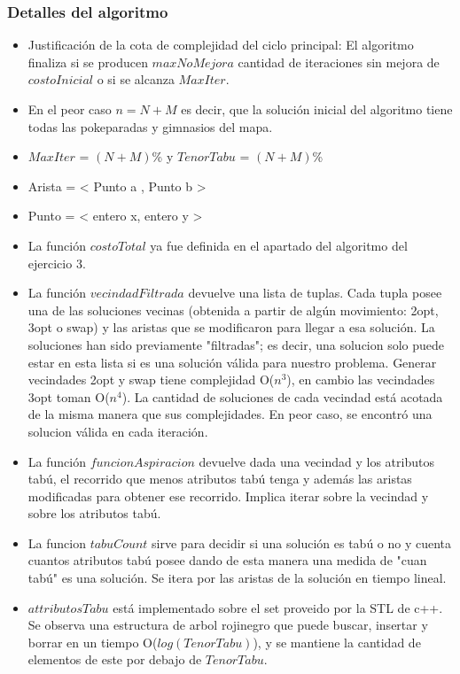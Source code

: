 \subsubsection*{Detalles del algoritmo}

\begin{itemize}
\item Justificación de la cota de complejidad del ciclo principal: El algoritmo finaliza si se producen $maxNoMejora$ cantidad de iteraciones sin mejora de $costoInicial$ o si se alcanza $MaxIter$. 
\item En el peor caso $n = N+M$ es decir, que la solución inicial del algoritmo tiene todas las pokeparadas y gimnasios del mapa.
\item $MaxIter$ = $(N+M)$\% y $TenorTabu$ = $(N+M)$\%
\item Arista = < Punto a , Punto b >
\item Punto = < entero x, entero y >
\item La función $costoTotal$ ya fue definida en el apartado del algoritmo del ejercicio 3.
\item La función $vecindadFiltrada$ devuelve una lista de tuplas. Cada tupla posee una de las soluciones vecinas (obtenida a partir de algún movimiento: 2opt, 3opt o swap) y las aristas que se modificaron para llegar a esa solución. La soluciones han sido previamente "filtradas"; es decir, una solucion solo puede estar en esta lista si es una solución válida para nuestro problema. Generar vecindades 2opt y swap tiene complejidad O($n^3$), en cambio las vecindades 3opt toman O($n^4$).
	La cantidad de soluciones de cada vecindad está acotada de la misma manera que sus complejidades. En peor caso, se encontró una solucion válida en cada iteraci\'on.
\item La función $funcionAspiracion$ devuelve dada una vecindad y los atributos tabú, el recorrido que menos atributos tabú tenga y además las aristas modificadas para obtener ese recorrido. Implica iterar sobre la vecindad y sobre los atributos tabú. 
\item La funcion $tabuCount$ sirve para decidir si una solución es tabú o no y cuenta cuantos atributos tabú posee dando de esta manera una medida de "cuan tabú" es una solución. Se itera por las aristas de la solución en tiempo lineal.
\item $attributosTabu$ está implementado sobre el set proveido por la STL de c++. Se observa una estructura de arbol rojinegro que puede buscar, insertar y borrar en un tiempo O($log(TenorTabu)$), y se mantiene la cantidad de elementos de este por debajo de $TenorTabu$.
\end{itemize}
